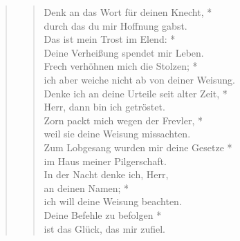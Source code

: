 \begin{quote}
\begin{verse}
Denk an das Wort für deinen Knecht, *\\
durch das du mir Hoffnung gabst.\\ 
\vin Das ist mein Trost im Elend: *\\ 
\vin Deine Verheißung spendet mir Leben.\\
Frech verhöhnen mich die Stolzen; *\\
ich aber weiche nicht ab von deiner Weisung.\\ 
\vin Denke ich an deine Urteile seit alter Zeit, *\\ 
\vin Herr, dann bin ich getröstet.\\
Zorn packt mich wegen der Frevler, *\\
weil sie deine Weisung missachten.\\ 
\vin Zum Lobgesang wurden mir deine Gesetze *\\ 
\vin im Haus meiner Pilgerschaft.\\
In der Nacht denke ich, Herr,\\
an deinen Namen; *\\
ich will deine Weisung beachten.\\ 
\vin Deine Befehle zu befolgen *\\ 
\vin ist das Glück, das mir zufiel.\\ 

\end{verse}
\end{quote}


